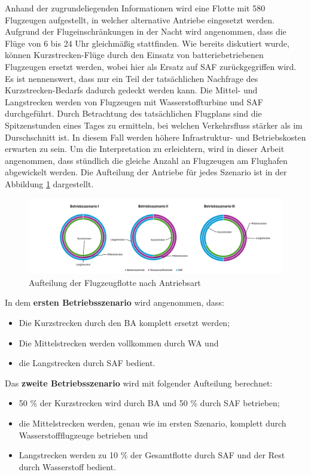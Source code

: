 Anhand der zugrundeliegenden Informationen wird eine Flotte mit 580 Flugzeugen aufgestellt, in welcher alternative Antriebe eingesetzt werden.
Aufgrund der Flugeinschränkungen in der Nacht wird angenommen, dass die Flüge von 6 bis 24 Uhr gleichmäßig stattfinden. 
Wie bereits diskutiert wurde, können Kurzstrecken-Flüge durch den Einsatz von batteriebetriebenen Flugzeugen ersetzt werden, 
wobei hier als Ersatz auf SAF zurückgegriffen wird. Es ist nennenswert, dass nur ein Teil der tatsächlichen Nachfrage des Kurzstrecken-Bedarfs 
dadurch gedeckt werden kann. Die Mittel- und Langstrecken werden von Flugzeugen mit Wasserstoffturbine und SAF durchgeführt.
%
Durch Betrachtung des tatsächlichen Flugplans sind die Spitzenstunden eines Tages zu ermitteln, bei welchen Verkehrsfluss stärker als im Durschschnitt ist.
In diesem Fall werden höhere Infrastruktur- und Betriebskosten erwarten zu sein.
Um die Interpretation zu erleichtern, wird in dieser Arbeit angenommen, dass stündlich die gleiche Anzahl an Flugzeugen 
am Flughafen abgewickelt werden. 
%
Die Aufteilung der Antriebe für jedes Szenario ist in der Abbildung \ref{betriebsszenarien} dargestellt.
%
\begin{figure}[h]
	\centering
	\includegraphics[width=1.0\linewidth]{Bilder/Betriebsszenarien.png}
	\caption[Betriebsszenarien]{Aufteilung der Flugzeugflotte nach Antriebsart}
	\label{betriebsszenarien}
\end{figure}
%
In dem \textbf{ersten Betriebsszenario} wird angenommen, dass:
\begin{itemize}
    \item Die Kurzstrecken durch den BA komplett ersetzt werden;
    \item Die Mittelstrecken werden vollkommen durch WA und
    \item die Langstrecken durch SAF bedient.
\end{itemize}
Das \textbf{zweite Betriebsszenario} wird mit folgender Aufteilung berechnet:
\begin{itemize}
    \item 50 \% der Kurzstrecken wird durch BA und 50 \% durch SAF betrieben; 
    \item die Mittelstrecken werden, genau wie im ersten Szenario, komplett durch Wasserstoffflugzeuge betrieben und 
    \item Langstrecken werden zu 10 \% der Gesamtflotte durch SAF und der Rest durch Wasserstoff bedient.
\end{itemize}
